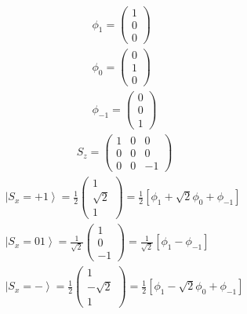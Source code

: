 \begin{equation}\begin{split}
\phi_1=\left(\begin{matrix}1\\0\\0\end{matrix}\right) \\
\phi_0=\left(\begin{matrix}0\\1\\0\end{matrix}\right) \\
\phi_{-1}=\left(\begin{matrix}0\\0\\1\end{matrix}\right) 
\end{split}\end{equation}
\begin{equation}\begin{split}
S_z=\left(\begin{matrix}1&0&0\\0&0&0\\0&0&-1\end{matrix}\right)
\end{split}\end{equation}
\begin{equation}\begin{split}
\left |S_x=+ 1 \right\rangle=\frac{1}{2}\left(\begin{matrix}1\\\sqrt{2}\\1\end{matrix}\right)=\frac{1}{2}\left[\phi _1+\sqrt{2}\phi_0 +\phi_{-1}\right] \\
\left |S_x=0 1 \right\rangle=\frac{1}{\sqrt{2}}\left(\begin{matrix}1\\0\\-1\end{matrix}\right)=\frac{1}{\sqrt{2}}\left[\phi _1-\phi_{-1}\right] \\
\left |S_x=- \right\rangle=\frac{1}{2}\left(\begin{matrix}1\\-\sqrt{2}\\1\end{matrix}\right)=\frac{1}{2}\left[\phi _1-\sqrt{2}\phi_0 +\phi_{-1}\right] 
\end{split}\end{equation}

